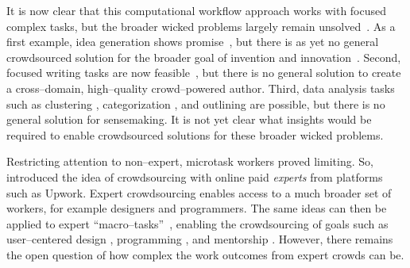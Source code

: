\documentclass[trackingWork]{subfiles}
\begin{document}
It is now clear that this computational workflow approach works with focused complex tasks, but
the broader wicked problems largely remain unsolved~\cite{rittel1973dilemmas}.
As a first example,
idea generation shows promise~\cite{YuEncouragingOutside,yu2014distributed,Yu2016a},
but there is as yet no general crowdsourced solution for
the broader goal of invention and innovation~\cite{fuge2014analysis}.
Second,
focused writing tasks are now feasible~\cite{Kim2017,bernsteinSoylent,Nebeling:2016:WCW:2858036.2858169,
      writingMicroTasks,agapie2015crowdsourcing}, but
there is no general solution to create
a cross--domain, high--quality crowd--powered author. 
Third,
data analysis tasks such as
clustering \cite{chilton2013cascade},
categorization \cite{andre2014crowd}, and
outlining \cite{luther2015crowdlines}
are possible, but there is no general solution for sensemaking.
It is not yet clear what insights would be required
to enable crowdsourced solutions for these broader wicked problems.

Restricting attention to non--expert, microtask workers proved limiting.
So, \citeauthor{foundry} introduced the idea of crowdsourcing with
online paid \textit{experts} from platforms such as Upwork.
Expert crowdsourcing enables access to a much broader set of workers,
for example designers and programmers.
The same ideas can then be applied to expert ``macro--tasks''~\cite{cheng2015break,haas2015argonaut}, enabling the crowdsourcing of goals such as user--centered design \cite{foundry},
programming \cite{latoza2014microtask,Fast2016,Chen2016}, and
mentorship \cite{suzukiAtelier}.
However, there remains the open question of
how complex the work outcomes from expert crowds can be.


\subsubsection{\pieceworkpers}

\begin{comment}
- Farm workers-->textile
- Limit: human management and oversight
- Evaluation
- Skilled work harder
- Only some organizations can use it
- Management practices
\end{comment}

\end{document}

